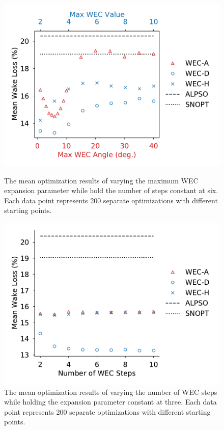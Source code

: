 \documentclass[a4paper]{jpconf}
\begin{document}
\begin{figure}[ht]
	\centering
	\begin{minipage}[t]{0.47\textwidth}
		\centering
		\includegraphics[width=\textwidth, trim={0cm 0cm 0cm 0cm}, clip]{maxwec_const_nsteps6_mean}
		\caption{The mean optimization results of varying the maximum WEC expansion parameter while hold the number of steps constant at six. Each data point represents 200 separate optimizations with different starting points.}
		\label{fig:aepmean-wm}
	\end{minipage}\hspace{1pc}
	\begin{minipage}[t]{0.47\textwidth}
		\centering
		\includegraphics[width=\textwidth]{nsteps_const_maxwec_mean}
		\caption{The mean optimization results of varying the number of WEC steps while holding the expansion parameter constant at three. Each data point represents 200 separate optimizations with different starting points.}
		\label{fig:aepmean-ws}
	\end{minipage}
\end{figure}
\end{document}
